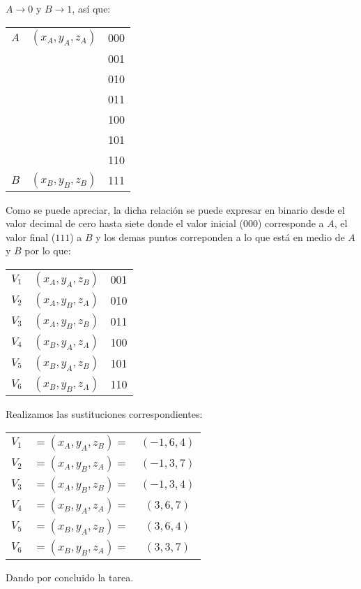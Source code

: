 \documentclass[letterpaper, 12pt]{article}
\begin{document}
\(A\rightarrow 0\) y \(B\rightarrow 1\), así que:
\begin{center}
    \begin{tabular}{ c c c }
    \(A\) & \((x_A,y_A,z_A)\) & 000\\
          &                   & 001\\
          &                   & 010\\
          &                   & 011\\
          &                   & 100\\
          &                   & 101\\
          &                   & 110\\
    \(B\) & \((x_B,y_B,z_B)\) & 111
    \end{tabular}
\end{center}
Como se puede apreciar, la dicha relación se puede expresar en binario desde el valor decimal de cero hasta siete donde el valor inicial (\(000\)) corresponde a \(A\), el valor final (\(111\)) a \(B\)
y los demas puntos correponden a lo que está en medio de \(A\) y \(B\) por lo que:
\begin{center}
    \begin{tabular}{ c c c }
        \(V_1\)& \((x_A,y_A,z_B)\) & 001\\
        \(V_2\)& \((x_A,y_B,z_A)\) & 010\\
        \(V_3\)& \((x_A,y_B,z_B)\) & 011\\
        \(V_4\)& \((x_B,y_A,z_A)\) & 100\\
        \(V_5\)& \((x_B,y_A,z_B)\) & 101\\
        \(V_6\)&  \((x_B,y_B,z_A)\) & 110\\
    \end{tabular}
\end{center}
Realizamos las sustituciones correspondientes:
\begin{center}
    \begin{tabular}{ c c c }
        \(V_1\)& \(=(x_A,y_A,z_B)=\) & \((-1,6,4)\)\\
        \(V_2\)& \(=(x_A,y_B,z_A)=\) & \((-1,3,7)\)\\
        \(V_3\)& \(=(x_A,y_B,z_B)=\) & \((-1,3,4)\)\\
        \(V_4\)& \(=(x_B,y_A,z_A)=\) & \((3,6,7)\)\\
        \(V_5\)& \(=(x_B,y_A,z_B)=\) & \((3,6,4)\)\\
        \(V_6\)&  \(=(x_B,y_B,z_A)=\) & \((3,3,7)\)\\
    \end{tabular}
\end{center}
Dando por concluido la tarea.
\end{document}
